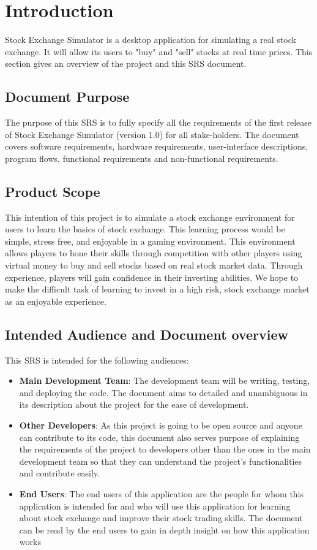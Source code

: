 \documentclass[12 pt, a4paper]{report}
\begin{document}
	
	
	\tableofcontents
	\chapter{Introduction}
	
	Stock Exchange Simulator is a desktop application for simulating a real stock exchange. It will allow its users to "buy" and "sell" stocks at real time prices. This section gives an overview of the project and this SRS document.
	\section {Document Purpose}
	The purpose of this SRS is to fully specify all the requirements of the first release of Stock Exchange Simulator (version 1.0) for all stake-holders. The document covers software requirements, hardware requirements, user-interface descriptions, program flows, functional requirements and non-functional requirements.
	
	\section{Product Scope}
		
	This intention of this project is to simulate a stock exchange environment for  users to learn the basics of stock exchange. This learning process would be simple, stress free, and enjoyable in a gaming environment. This environment allows players to hone their skills through competition with other players using virtual money to  buy and sell stocks based on real stock market data. Through experience, players will gain confidence in their investing abilities. We hope to make the difficult task of learning to invest in a high risk, stock exchange market as an enjoyable experience.
	
	\section{Intended Audience and Document overview}
	
	This SRS is intended for the following audiences:
	\begin{itemize}
		\item \textbf{Main Development Team}: The development team will be writing, testing, and deploying the code. The document aims to detailed and unambiguous in its description about the project for the ease of development.
		\item \textbf{Other Developers}: As this project is going to be open source and anyone can contribute to its code, this document also serves purpose of explaining the requirements of the project to developers other than the ones in the main development team so that they can understand the project's functionalities and contribute easily.
		\item \textbf{End Users}: The end users of this application are the people for whom this application is intended for and who will use this application for learning about stock exchange and improve their stock trading skills. The document can be read by the end users to gain in depth insight on how this application works
	\end{itemize}
\end{document}
